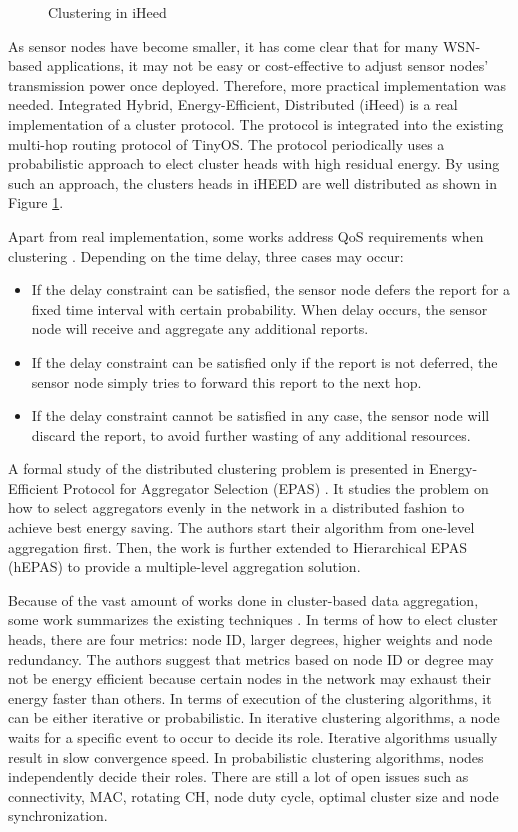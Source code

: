 \begin{figure}
\centering
{}
\caption{Clustering in iHeed}
\label{fig:iHeed}
\end{figure}

As sensor nodes have become smaller, it has come clear that for many WSN-based applications, it may not be easy or cost-effective to adjust sensor nodes' transmission power once deployed. Therefore, more practical implementation was needed. Integrated Hybrid, Energy-Efficient, Distributed (iHeed) \cite{iheed} is a real implementation of a cluster protocol. The protocol is integrated into the existing multi-hop routing protocol of TinyOS. The protocol periodically uses a probabilistic approach to elect cluster heads with high residual energy. By using such an approach, the clusters heads in iHEED are well distributed as shown in Figure \ref{fig:iHeed}.

Apart from real implementation, some works address QoS requirements when clustering \cite{qdap}. Depending on the time delay, three cases may occur:
\begin{itemize}
	\item If the delay constraint can be satisfied, the sensor node defers the report for a fixed time interval with certain probability. When delay occurs, the sensor node will receive and aggregate any additional reports.
	\item If the delay constraint can be satisfied only if the report is not deferred, the sensor node simply tries to forward this report to the next hop.
	\item If the delay constraint cannot be satisfied in any case, the sensor node will discard the report, to avoid further wasting of any additional resources.
\end{itemize}

A formal study of the distributed clustering problem is presented in Energy-Efficient Protocol for Aggregator Selection (EPAS) \cite{epas}. It studies the problem on how to select aggregators evenly in the network in a distributed fashion to achieve best energy saving. The authors start their algorithm from one-level aggregation first. Then, the work is further extended to Hierarchical EPAS (hEPAS) to provide a multiple-level aggregation solution.

Because of the vast amount of works done in cluster-based data aggregation, some work summarizes the existing techniques \cite{clusteringsurvey}. In terms of how to elect cluster heads, there are four metrics: node ID, larger degrees, higher weights and node redundancy. The authors suggest that metrics based on node ID or degree may not be energy efficient because certain nodes in the network may exhaust their energy faster than others. In terms of execution of the clustering algorithms, it can be either iterative or probabilistic. In iterative clustering algorithms, a node waits for a specific event to occur to decide its role. Iterative algorithms usually result in slow convergence speed. In probabilistic clustering algorithms, nodes independently decide their roles. There are still a lot of open issues such as connectivity, MAC, rotating CH, node duty cycle, optimal cluster size and node synchronization.

